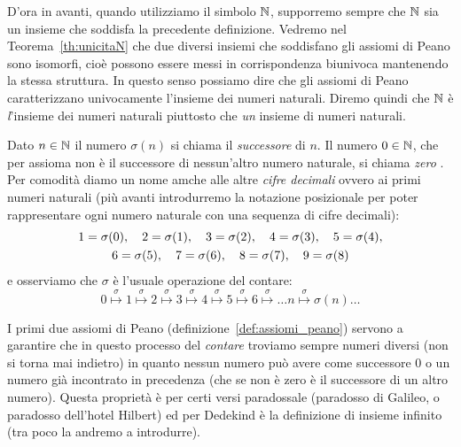 D'ora in avanti, quando utilizziamo il simbolo ${\mathbb N}$, supporremo sempre che ${\mathbb N}$ sia un insieme che soddisfa la precedente definizione.
Vedremo nel Teorema~\ref{th:unicitaN} che due diversi insiemi che soddisfano gli assiomi di Peano 
sono isomorfi, cioè possono essere messi in corrispondenza biunivoca mantenendo la stessa struttura.
In questo senso possiamo dire che gli assiomi di Peano caratterizzano univocamente 
l'insieme dei numeri naturali. 
Diremo quindi che ${\mathbb N}$ è \emph{l}'insieme dei numeri naturali piuttosto 
che \emph{un} insieme di numeri naturali.

Dato $n\in {\mathbb N}$ il numero $\sigma(n)$ si chiama il \emph{successore}%
%
 di $n$. 
Il numero $0\in {\mathbb N}$, che per assioma non è il successore di nessun'altro 
numero naturale, si chiama \emph{zero}%
%
. 
Per comodità diamo un nome amche alle altre \emph{cifre decimali}
%
%
ovvero ai primi numeri naturali
(più avanti introdurremo la notazione posizionale per poter rappresentare ogni numero naturale 
con una sequenza di cifre decimali):
\begin{equation}\label{eq:cifre}
\begin{gathered}
 1 = \sigma(0),\quad  
 2 = \sigma(1),\quad
 3 = \sigma(2),\quad 
 4 = \sigma(3),\quad
 5 = \sigma(4),\\ 
 6 = \sigma(5),\quad 
 7 = \sigma(6),\quad 
 8 = \sigma(7),\quad 
 9 = \sigma(8)
\end{gathered}
\end{equation}
e osserviamo che $\sigma$ è l'usuale operazione del contare:
 \[
 0 \stackrel\sigma\mapsto 1 \stackrel\sigma\mapsto 2 \stackrel\sigma\mapsto 
 3 \stackrel\sigma\mapsto 4 \stackrel\sigma\mapsto 5 \stackrel\sigma\mapsto 
 6 \stackrel\sigma\mapsto \dots  n \stackrel\sigma\mapsto \sigma(n) \dots
 \]

I primi due assiomi di Peano (definizione~\ref{def:assiomi_peano}) 
servono a garantire che in questo processo del \emph{contare}%
%
troviamo sempre numeri diversi (non si torna mai indietro) in quanto nessun numero 
può avere come successore $0$ o un numero già incontrato in precedenza (che 
se non è zero è il successore di un altro numero).
Questa proprietà è per certi versi paradossale
(paradosso di Galileo, o paradosso dell'hotel Hilbert)
%
%
%
%
ed per Dedekind è la definizione di insieme infinito (tra poco la andremo a introdurre).%
%


